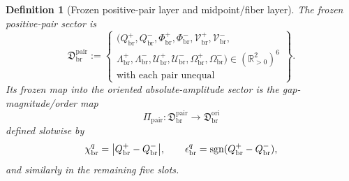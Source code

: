 \documentclass[11pt]{article}
\newcommand{\OriginSector}{\mathfrak D_{\mathrm{br}}^{\mathrm{ori}}}
\newcommand{\AbsReadAmp}{\chi_{\mathrm{br}}^{q}}
\newcommand{\PolRead}{\epsilon_{\mathrm{br}}^{q}}
\newcommand{\PairSector}{\mathfrak D_{\mathrm{br}}^{\mathrm{pair}}}
\newcommand{\PairMap}{\Pi_{\mathrm{pair}}}
\newcommand{\PairReadPlus}{Q_{\mathrm{br}}^{+}}
\newcommand{\PairReadMinus}{Q_{\mathrm{br}}^{-}}
\newcommand{\PairCovPlus}{\Phi_{\mathrm{br}}^{+}}
\newcommand{\PairCovMinus}{\Phi_{\mathrm{br}}^{-}}
\newcommand{\PairRelaxPlus}{\mathcal V_{\mathrm{br}}^{+}}
\newcommand{\PairRelaxMinus}{\mathcal V_{\mathrm{br}}^{-}}
\newcommand{\PairWellPlus}{\Lambda_{\mathrm{br}}^{+}}
\newcommand{\PairWellMinus}{\Lambda_{\mathrm{br}}^{-}}
\newcommand{\PairEqPlus}{\mathcal U_{\mathrm{br}}^{+}}
\newcommand{\PairEqMinus}{\mathcal U_{\mathrm{br}}^{-}}
\newcommand{\PairScalePlus}{\Omega_{\mathrm{br}}^{+}}
\newcommand{\PairScaleMinus}{\Omega_{\mathrm{br}}^{-}}
\newtheorem{definition}{Definition}
\begin{document}
\begin{definition}[Frozen positive-pair layer and midpoint/fiber layer]
\label{def:pairmid}
The frozen positive-pair sector is
\begin{equation}
\PairSector
:=
\left\{
\begin{array}{l}
(\PairReadPlus,\PairReadMinus,\PairCovPlus,\PairCovMinus,\PairRelaxPlus,\PairRelaxMinus,\\
\PairWellPlus,\PairWellMinus,\PairEqPlus,\PairEqMinus,\PairScalePlus,\PairScaleMinus)
\in(\mathbb R_{>0}^{2})^{6}
\\[0.3em]
\text{with each pair unequal}
\end{array}
\right\}.
\label{eq:pairsector}
\end{equation}
Its frozen map into the oriented absolute-amplitude sector is the gap-magnitude/order map
\begin{equation}
\PairMap:\PairSector\longrightarrow\OriginSector
\label{eq:pairmap}
\end{equation}
defined slotwise by
\begin{equation}
\AbsReadAmp=\abs{\PairReadPlus-\PairReadMinus},
\qquad
\PolRead=\operatorname{sgn}(\PairReadPlus-\PairReadMinus),
\label{eq:pairread}
\end{equation}
and similarly in the remaining five slots.


\end{definition}
\end{document}

